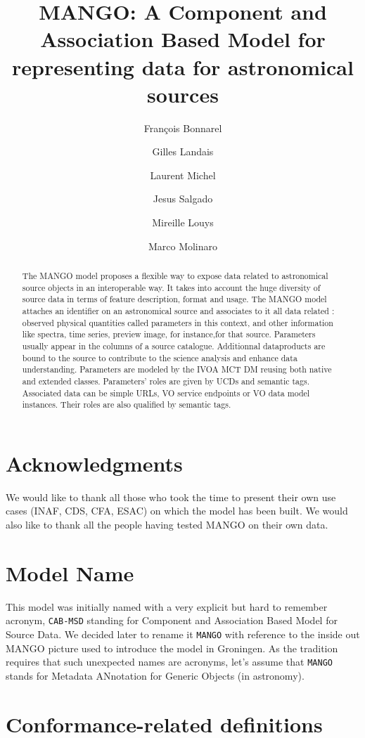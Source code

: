 \documentclass[11pt,a4paper]{ivoa}
\title{MANGO: A Component and Association Based Model for representing data for astronomical sources}
\author{François Bonnarel}
\author{Gilles Landais}
\author{Laurent Michel}
\author{Jesus Salgado}
\author{Mireille Louys}
\author{Marco Molinaro}
\begin{document}
\begin{abstract}
The MANGO model proposes a flexible way to expose data related to astronomical source objects in an interoperable way.
It takes into account the huge diversity of source data in terms of feature description, format and usage.
The MANGO model attaches an identifier on an astronomical source and associates to it all data related : observed physical quantities called parameters in this context, and other information like spectra, time series, preview image, for instance,for that source.
Parameters usually appear in the columns of a source catalogue. Additionnal dataproducts are bound to the source to contribute to the science analysis and enhance data understanding.
Parameters are modeled by the IVOA MCT DM reusing both native and extended classes. Parameters' roles are given by UCDs and semantic tags.
Associated data can be simple URLs, VO service endpoints or VO data model instances. Their roles are also qualified by semantic tags.

\end{abstract}


\section*{Acknowledgments}

We would like to thank all those who took the time to present their own use cases (INAF, CDS, CFA, ESAC) on which the model has been built.
We would also like to thank all the people having tested MANGO on their own data.

\section*{Model Name}
This model was initially named with a very explicit but hard to remember acronym, \texttt{CAB-MSD} standing for Component and Association Based Model for Source Data. We decided later to rename it \texttt{MANGO} with reference to the inside out MANGO picture used to introduce the model in Groningen. As the tradition requires that such unexpected names are acronyms, let's assume that \texttt{MANGO} stands for
Metadata ANnotation for Generic Objects (in astronomy).


\section*{Conformance-related definitions}
\end{document}
